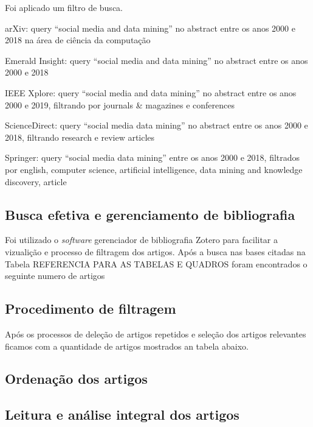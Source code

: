 

Foi aplicado um filtro de busca.

arXiv: query ``social media and data mining'' no abstract entre os anos 2000 e 2018 na área de ciência da computação

Emerald Insight: query ``social media and data mining'' no abstract entre os anos 2000 e 2018

IEEE Xplore: query ``social media and data mining'' no abstract entre os anos 2000 e 2019, filtrando por journals \& magazines e conferences

ScienceDirect: query ``social media data mining'' no abstract entre os anos 2000 e 2018, filtrando research e review articles

Springer: query ``social media data mining'' entre os anos 2000 e 2018, filtrados por english, computer science, artificial intelligence, data mining and knowledge discovery, article

\subsection{Busca efetiva e gerenciamento de bibliografia}
\label{subsec:buscaEfetivaRevisao}

Foi utilizado o \textit{software} gerenciador de bibliografia Zotero para facilitar a vizualição e processo de filtragem dos artigos. Após a busca nas bases citadas na Tabela REFERENCIA PARA AS TABELAS E QUADROS foram encontrados o seguinte numero de artigos



\subsection{Procedimento de filtragem}
\label{subsec:filtragemRevisao}

Após os processos de deleção de artigos repetidos e seleção dos artigos relevantes ficamos com a quantidade de artigos mostrados an tabela abaixo.



\subsection{Ordenação dos artigos}
\label{subsec:ordenacaoRevisao}

\subsection{Leitura e análise integral dos artigos}
\label{subsec:leituraIntegralRevisao}

